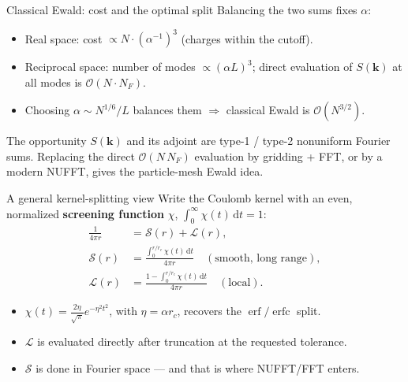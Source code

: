 \documentclass[aspectratio=169,11pt]{beamer}
\newcommand{\cO}{\mathcal{O}}
\newcommand{\dd}{\,\mathrm d}
\newcommand{\kk}{\bm{k}}
\newcommand{\hl}[1]{{\color{CCMorange}\textbf{#1}}}
\DeclareMathOperator{\erf}{erf}
\DeclareMathOperator{\erfc}{erfc}
\begin{document}
\begin{frame}{Classical Ewald: cost and the optimal split}
\small
Balancing the two sums fixes \(\alpha\):
\begin{itemize}
  \item Real space: cost \(\propto N\cdot(\alpha^{-1})^3\) (charges within the cutoff).
  \item Reciprocal space: number of modes \(\propto (\alpha L)^3\); direct evaluation of \(S(\kk)\) at all modes is \(\cO(N\cdot N_F)\).
  \item Choosing \(\alpha\sim N^{1/6}/L\) balances them \(\Rightarrow\) classical Ewald is \hl{\(\cO(N^{3/2})\)}.
\end{itemize}
\begin{block}{The opportunity}
\(S(\kk)\) and its adjoint are type-1 / type-2 nonuniform Fourier sums.
Replacing the direct \(\cO(N\,N_F)\) evaluation by gridding + FFT, or by a
modern NUFFT, gives the particle-mesh Ewald idea.
\end{block}
\end{frame}

\begin{frame}{A general kernel-splitting view}
\small
Write the Coulomb kernel with an even, normalized \hl{screening function} \(\chi\), \(\int_0^\infty\chi(t)\dd t=1\):
\[
  \begin{aligned}
  \frac{1}{4\pi r}&=\mathcal S(r)+\mathcal L(r),\\
  \mathcal S(r)&=\frac{\int_0^{r/r_c}\chi(t)\dd t}{4\pi r}\quad (\text{smooth, long range}),\\
  \mathcal L(r)&=\frac{1-\int_0^{r/r_c}\chi(t)\dd t}{4\pi r}\quad (\text{local}).
  \end{aligned}
\]
\begin{itemize}
  \item \(\chi(t)=\tfrac{2\eta}{\sqrt\pi}e^{-\eta^2t^2}\), with \(\eta=\alpha r_c\), recovers the \(\erf/\erfc\) split.
  \item \(\mathcal L\) is evaluated directly after truncation at the requested tolerance.
  \item \(\mathcal S\) is done in Fourier space --- and that is where NUFFT/FFT enters.
\end{itemize}
\end{frame}
\end{document}

